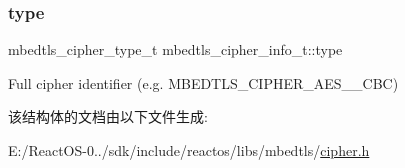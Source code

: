 \subsubsection{\texorpdfstring{type}{type}}
{\footnotesize\ttfamily mbedtls\+\_\+cipher\+\_\+type\+\_\+t mbedtls\+\_\+cipher\+\_\+info\+\_\+t\+::type}

Full cipher identifier (e.\+g. M\+B\+E\+D\+T\+L\+S\+\_\+\+C\+I\+P\+H\+E\+R\+\_\+\+A\+E\+S\+\_\+\_\+\+C\+BC) 

该结构体的文档由以下文件生成\+:\begin{DoxyCompactItemize}
\item 
E\+:/\+React\+O\+S-\/0../sdk/include/reactos/libs/mbedtls/\hyperlink{cipher_8h}{cipher.\+h}\end{DoxyCompactItemize}

